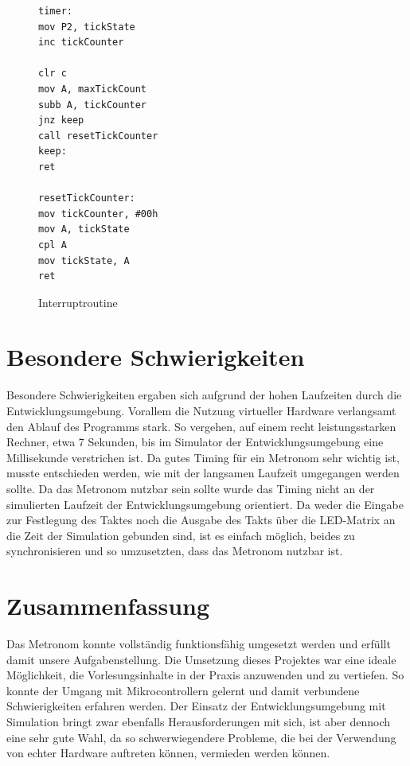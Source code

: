\documentclass[a4paper, 12pt]{scrartcl}
\begin{document}
\begin{onehalfspace}
\begin{figure}
\begin{lstlisting}
timer:
mov P2, tickState	
inc tickCounter		

clr c
mov A, maxTickCount
subb A, tickCounter	
jnz keep
call resetTickCounter	
keep:
ret

resetTickCounter:
mov tickCounter, #00h	
mov A, tickState	
cpl A
mov tickState, A
ret
\end{lstlisting}
\caption{Interruptroutine}
\label{lst:timer}
\end{figure}

\newpage
\section{Besondere Schwierigkeiten}
\label{schwierigkeiten}
Besondere Schwierigkeiten ergaben sich aufgrund der hohen Laufzeiten durch die Entwicklungsumgebung. Vorallem die Nutzung virtueller Hardware verlangsamt den Ablauf des Programms stark. So vergehen, auf einem recht leistungsstarken Rechner, etwa 7 Sekunden, bis im Simulator der Entwicklungsumgebung eine Millisekunde verstrichen ist. Da gutes Timing für ein Metronom sehr wichtig ist, musste entschieden werden, wie mit der langsamen Laufzeit umgegangen werden sollte. Da das Metronom nutzbar sein sollte wurde das Timing nicht an der simulierten Laufzeit der Entwicklungsumgebung orientiert. Da weder die Eingabe zur Festlegung des Taktes noch die Ausgabe des Takts über die LED-Matrix an die Zeit der Simulation gebunden sind, ist es einfach möglich, beides zu synchronisieren und so umzusetzten, dass das Metronom nutzbar ist.

\section{Zusammenfassung}
Das Metronom konnte vollständig funktionsfähig umgesetzt werden und erfüllt damit unsere Aufgabenstellung. Die Umsetzung dieses Projektes war eine ideale Möglichkeit, die Vorlesungsinhalte in der Praxis anzuwenden und zu vertiefen. So konnte der Umgang mit Mikrocontrollern gelernt und damit verbundene Schwierigkeiten erfahren werden. Der Einsatz der Entwicklungsumgebung mit Simulation bringt zwar ebenfalls Herausforderungen mit sich, ist aber dennoch eine sehr gute Wahl, da so schwerwiegendere Probleme, die bei der Verwendung von echter Hardware auftreten können, vermieden werden können.

\newpage

\end{onehalfspace}
\end{document}
